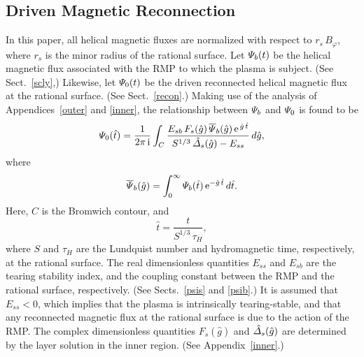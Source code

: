 \documentclass[12pt,prb,aps]{revtex4-1}
\begin{document}
\subsection{Driven Magnetic Reconnection}
In this paper, all helical magnetic fluxes are normalized with respect to $r_s\,B_\varphi$, where $r_s$ is the minor radius of the rational surface. Let ${\mit\Psi}_b(t)$ be the helical magnetic flux associated with the RMP to which the plasma is
subject. (See Sect.~\ref{scly},) Likewise, let ${\mit\Psi}_0(t)$ be the driven reconnected helical magnetic flux at the rational surface. (See Sect.~\ref{recon}.)
Making use of the analysis of Appendices~\ref{outer} and \ref{inner}, the relationship between ${\mit\Psi}_b$ and ${\mit\Psi}_0$ is found to be
\begin{equation}\label{drive}
{\mit\Psi}_0(\hat{t}) = \frac{1}{2\pi\,{\rm i}}\int_C \frac{E_{sb}\,F_s(\hat{g})\,\overline{\mit\Psi}_b(\hat{g})\,{\rm e}^{\,\hat{g}\,\hat{t}}}{S^{1/3}\,\hat{\mit\Delta}_s(\hat{g})-E_{ss}}\,d\hat{g},
\end{equation}
where
\begin{equation}\label{psibx}
\overline{\mit\Psi}_b(\hat{g}) = \int_0^\infty {\mit\Psi}_b(\hat{t})\,{\rm e}^{-\hat{g}\,\hat{t}}\,d\hat{t}.
\end{equation}
Here, $C$ is the Bromwich contour, and 
\begin{equation}
\hat{t} =\frac{t}{S^{1/3}\,\tau_H},
\end{equation}
where $S$ and $\tau_H$ are the Lundquist number and hydromagnetic time, respectively, at the rational surface. The real dimensionless quantities $E_{ss}$ and $E_{sb}$
are the tearing stability index, and the coupling constant between the RMP and the rational surface, respectively. (See Sects.~\ref{psis} and \ref{psib}.) It is assumed that
$E_{ss}<0$, which implies that the plasma is intrinsically tearing-stable, and that any reconnected magnetic flux at the rational surface is due to the action of the RMP. 
The complex dimensionless quantities $F_s(\hat{g})$ and $\hat{\mit\Delta}_s(\hat{g})$ are determined by the layer solution in the inner region. (See Appendix~\ref{inner}.)
\end{document}
